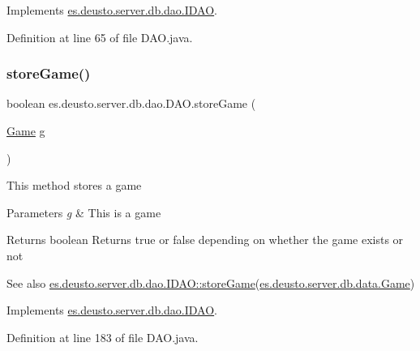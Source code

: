 Implements \hyperlink{interfacees_1_1deusto_1_1server_1_1db_1_1dao_1_1_i_d_a_o_a19f9b0d0b6f5f80730d6d197deca7dfc}{es.\+deusto.\+server.\+db.\+dao.\+I\+D\+AO}.



Definition at line 65 of file D\+A\+O.\+java.

\mbox{\label{classes_1_1deusto_1_1server_1_1db_1_1dao_1_1_d_a_o_a7484309d9b9b39c24cd7d0413a90c468}} 
\subsubsection{\texorpdfstring{store\+Game()}{storeGame()}}
{\footnotesize\ttfamily boolean es.\+deusto.\+server.\+db.\+dao.\+D\+A\+O.\+store\+Game (\begin{DoxyParamCaption}\item[{\hyperlink{classes_1_1deusto_1_1server_1_1db_1_1data_1_1_game}{Game}}]{g }\end{DoxyParamCaption})}

This method stores a game 
\begin{DoxyParams}{Parameters}
{\em g} & This is a game \\
\hline
\end{DoxyParams}
\begin{DoxyReturn}{Returns}
boolean Returns true or false depending on whether the game exists or not 
\end{DoxyReturn}
\begin{DoxySeeAlso}{See also}
\hyperlink{interfacees_1_1deusto_1_1server_1_1db_1_1dao_1_1_i_d_a_o_ab38972c7c70c95b4c409fa7758ef2fc3}{es.\+deusto.\+server.\+db.\+dao.\+I\+D\+A\+O\+::store\+Game}(\hyperlink{classes_1_1deusto_1_1server_1_1db_1_1data_1_1_game}{es.\+deusto.\+server.\+db.\+data.\+Game}) 
\end{DoxySeeAlso}


Implements \hyperlink{interfacees_1_1deusto_1_1server_1_1db_1_1dao_1_1_i_d_a_o_ab38972c7c70c95b4c409fa7758ef2fc3}{es.\+deusto.\+server.\+db.\+dao.\+I\+D\+AO}.



Definition at line 183 of file D\+A\+O.\+java.

\mbox{\label{classes_1_1deusto_1_1server_1_1db_1_1dao_1_1_d_a_o_acb146e96959c340ef828ef8e36b4283c}} 
